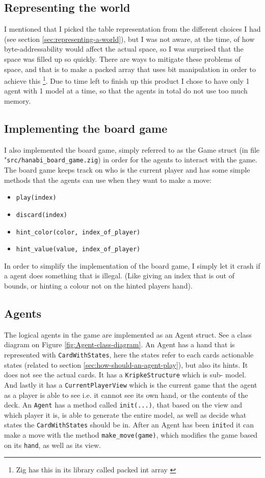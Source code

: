 \subsection{Representing the world}
I mentioned that I picked the table representation from the different choices I had (see section \ref{sec:representing-a-world}), but I was not aware, at the time, of how byte-addressability would affect the actual space, so I was surprised that the space was filled up so quickly.
There are ways to mitigate these problems of space, and that is to make a packed array that uses bit manipulation in order to achieve this \footnote{Zig has this in its library called packed int array \cite{zigpackedintarr}}.
Due to time left to finish up this product I chose to have only 1 agent with 1 model at a time, so that the agents in total do not use too much memory.

\subsection{Implementing the board game}
I also implemented the board game, simply referred to as the Game struct (in file "{\tt src/hanabi\_board\_game.zig}) in order for the agents to interact with the game.
The board game keeps track on who is the current player and has some simple methods that the agents can use when they want to make a move:

\begin{itemize}
	\item {\tt play(index)}
	\item {\tt discard(index)}
	\item {\tt hint\_color(color, index\_of\_player) }
	\item {\tt hint\_value(value, index\_of\_player) }
\end{itemize}
In order to simplify the implementation of the board game, I simply let it crash if a agent does something that is illegal.
(Like giving an index that is out of bounds, or hinting a colour not on the hinted players hand).


\subsection{Agents}
The logical agents in the game are implemented as an Agent struct.
See a class diagram on Figure \ref{fig:Agent-class-diagram}.
An Agent has a hand that is represented with {\tt CardWithStates}, here the states refer to each cards actionable states (related to section \ref{sec:how-should-an-agent-play}), but also its hints.
It does not see the actual cards.
It has a {\tt KripkeStructure} which is sub-\SfiveN{} model.
And lastly it has a {\tt CurrentPlayerView} which is the current game that the agent as a player is able to see i.e. it cannot see its own hand, or the contents of the deck.
An {\tt Agent} has a method called {\tt init(...)}, that based on the view and which player it is, is able to generate the entire model, as well as decide what states the {\tt CardWithStates} should be in.
After an Agent has been {\tt init}ed it can make a move with the method {\tt make\_move(game)}, which modifies the game based on its {\tt hand}, as well as its view.

